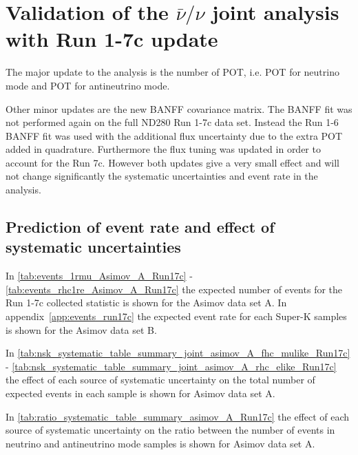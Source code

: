 \clearpage


\section{Validation of the $\bar{\nu}/\nu$ joint analysis with Run 1-7c update}
\label{sec:validation_run17c}

The major update to the analysis is the number of POT, 
i.e. 
\TotalPotNuRunOneSevenC{} POT for neutrino mode
and
\TotalPotNuBarRunOneSevenC{} POT for antineutrino mode. 

Other minor updates are the new BANFF covariance matrix.
The BANFF fit was not performed again on the full ND280 Run 1-7c data set. Instead the Run 1-6
BANFF fit was used with the additional flux uncertainty due to the extra POT added in quadrature. 
Furthermore the flux tuning was updated in order to account for the Run 7c.
However both updates give a very small effect and will not change significantly the systematic
uncertainties and event rate in the analysis.

%
%

\subsection{Prediction of event rate and effect of systematic uncertainties}
\label{sec:event_rate_syst_run17c}




In \cref{tab:events_1rmu_Asimov_A_Run17c} - \ref{tab:events_rhc1re_Asimov_A_Run17c} 
the expected number of events for the Run 1-7c collected statistic is shown for the Asimov data set A.
In appendix~\ref{app:events_run17c} the expected event rate for each Super-K samples is shown for the Asimov data set B.






\clearpage

In \cref{tab:nsk_systematic_table_summary_joint_asimov_A_fhc_mulike_Run17c} - 
\cref{tab:nsk_systematic_table_summary_joint_asimov_A_rhc_elike_Run17c}
the effect of each source of systematic uncertainty on the total number of expected events in each sample is shown
for Asimov data set A.

In \cref{tab:ratio_systematic_table_summary_asimov_A_Run17c} 
the effect of each source of systematic uncertainty on the ratio between the number of events in 
neutrino and antineutrino mode samples is shown for Asimov data set A.

